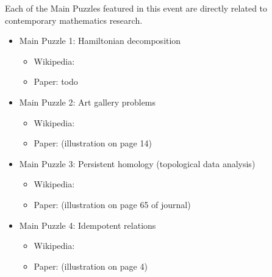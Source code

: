 Each of the Main Puzzles featured in this event are directly related
to contemporary mathematics research.

\begin{itemize}
\item Main Puzzle 1: Hamiltonian decomposition
\begin{itemize}
\item Wikipedia: 
\item Paper: todo
\end{itemize}
\item Main Puzzle 2: Art gallery problems 
\begin{itemize}
\item Wikipedia: 
\item Paper:  
      (illustration on page 14)
\end{itemize}
\item Main Puzzle 3: Persistent homology (topological data analysis) 
\begin{itemize}
\item Wikipedia: 
\item Paper: 
      (illustration on page 65 of journal)
\end{itemize}
\item Main Puzzle 4: Idempotent relations 
\begin{itemize}
\item Wikipedia: 
\item Paper: 
      (illustration on page 4)
\end{itemize}
\end{itemize}
